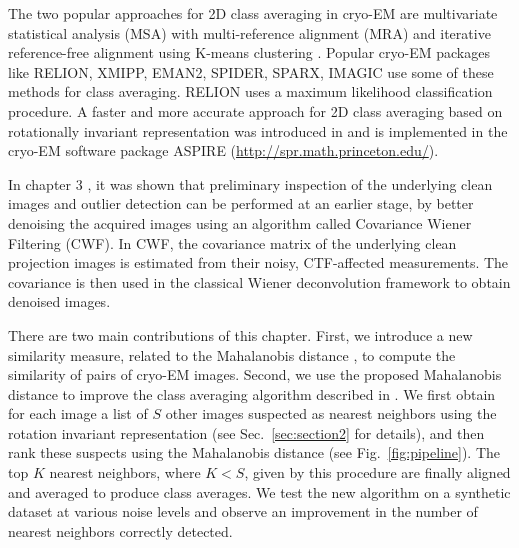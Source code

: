 The two popular approaches for 2D class averaging \cite{Penczek1992,Penczek1996, vanHeel1990a, vanHeel1981, park, chirikjian2} in cryo-EM are multivariate statistical analysis (MSA)\cite{vanHeel1981} with multi-reference alignment (MRA) \cite{Dube1993} and iterative reference-free alignment using K-means clustering \cite{Penczek1996}. Popular cryo-EM packages like RELION, XMIPP, EMAN2, SPIDER, SPARX, IMAGIC \cite{imagic, spider, eman2, xmipp, relion, gpurelion} use some of these methods for class averaging. RELION uses a maximum likelihood classification procedure. A faster and more accurate approach for 2D class averaging based on rotationally invariant representation was introduced in \cite{zhao} and is implemented in the cryo-EM software package ASPIRE (\url{http://spr.math.princeton.edu/}).

In chapter 3 \cite{Bhamre2016}, it was shown that preliminary inspection of the underlying clean images and outlier detection can be performed at an earlier stage, by better denoising the acquired images using an algorithm called Covariance Wiener Filtering (CWF). In CWF, the covariance matrix of the underlying clean projection images is estimated from their noisy, CTF-affected measurements. The covariance is then used in the classical Wiener deconvolution framework to obtain denoised images. 

There are two main contributions of this chapter. First, we introduce a new similarity measure, related to the Mahalanobis distance \cite{mah}, to compute the similarity of pairs of cryo-EM images. Second, we use the proposed Mahalanobis distance to improve the class averaging algorithm described in \cite{zhao}. We first obtain for each image a list of $S$ other images suspected as nearest neighbors using the rotation invariant representation (see Sec.~\ref{sec:section2} for details), and then rank these suspects using the Mahalanobis distance (see Fig.~\ref{fig:pipeline}). The top $K$ nearest neighbors, where $K<S$, given by this procedure are finally aligned and averaged to produce class averages. We test the new algorithm on a synthetic dataset at various noise levels and observe an improvement in the number of nearest neighbors correctly detected.

